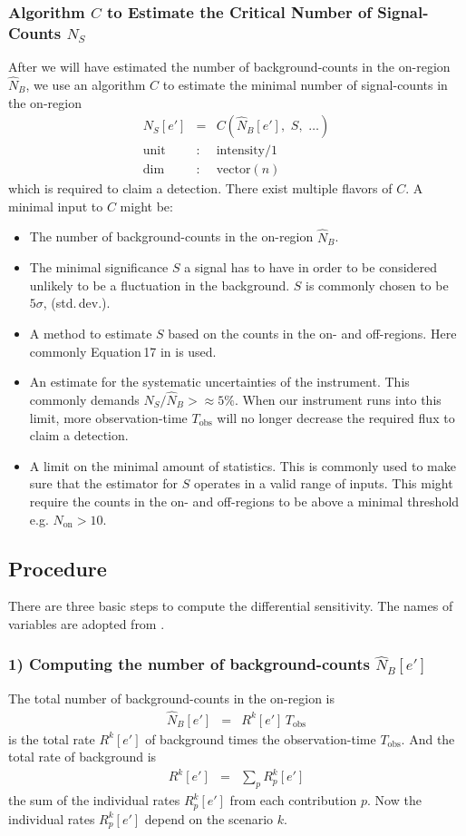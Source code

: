 \documentclass{article}%
\begin{document}
\subsubsection*{Algorithm $C$ to Estimate the Critical Number of Signal-Counts $N_S$}
%
After we will have estimated the number of background-counts in the on-region $\hat{N}_B$, we use an algorithm $C$ to estimate the minimal number of signal-counts in the on-region
%
\begin{eqnarray*}
N_S[e'] &=& C(\hat{N}_B[e'],\,\,S,\,\,\dots)\\
\text{unit} &:& \text{intensity}/1\\
\text{dim} &:& \text{vector}(n)
\end{eqnarray*}
%
which is required to claim a detection.
%
There exist multiple flavors of $C$.
%
A minimal input to $C$ might be:
%
\begin{itemize}
%
\item{} The number of background-counts in the on-region $\hat{N}_B$.
%
\item{} The minimal significance $S$ a signal has to have in order to be considered unlikely to be a fluctuation in the background.
%
$S$ is commonly chosen to be $5\sigma$, (std.\,dev.).
%
\item{} A method to estimate $S$ based on the counts in the on- and off-regions. Here commonly Equation\,17 in \cite{li1983analysis} is used.
%
\item{} An estimate for the systematic uncertainties of the instrument. This commonly demands $N_S/\hat{N}_B >\approx 5\%$.
%
When our instrument runs into this limit, more observation-time $T_\text{obs}$ will no longer decrease the required flux to claim a detection.
%
\item{}
A limit on the minimal amount of statistics. This is commonly used to make sure that the estimator for $S$ operates in a valid range of inputs.
%
This might require the counts in the on- and off-regions to be above a minimal threshold e.g. $N_\text{on} > 10$.
%
\end{itemize}
%
\subsection{Procedure}
\label{SubSecProcedure}
%
There are three basic steps to compute the differential sensitivity.
%
The names of variables are adopted from \cite{li1983analysis}.
%
\subsubsection*{1) Computing the number of background-counts $\hat{N}_B[e']$}
%
The total number of background-counts in the on-region is
%
\begin{eqnarray}
\hat{N}_B[e'] &=& R^k[e'] \, T_\text{obs}
\end{eqnarray}
%
is the total rate $R^k[e']$ of background times the observation-time $T_\text{obs}$.
%
And the total rate of background is
%
\begin{eqnarray}
R^k[e'] &=& \sum_{p} R^k_p[e']
\end{eqnarray}
%
the sum of the individual rates $R^k_p[e']$ from each contribution $p$.
%
Now the individual rates $R^k_p[e']$ depend on the scenario $k$.
%
\end{document}
